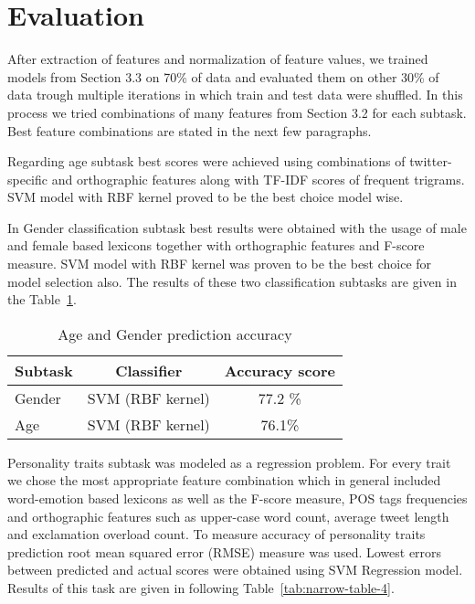 \documentclass[10pt, a4paper]{article}
\begin{document}
\section{Evaluation}
After extraction of features and normalization of feature values, we trained models from Section 3.3  on 70\% of data and evaluated them on other 30\% of data trough multiple iterations in which train and test data were shuffled. In this process we tried combinations of many features from Section 3.2 for each subtask. Best feature combinations are stated in the next few paragraphs. 
\par
Regarding age subtask best scores were achieved using combinations of twitter-specific  and orthographic features along with TF-IDF scores of frequent trigrams. SVM model with RBF kernel proved to be the best choice model wise.
\par
In Gender classification subtask best results were obtained with the usage of male and female based lexicons together with orthographic features and F-score measure. SVM model with RBF kernel was proven to be the best choice for model selection also. The results of these two classification subtasks are given in the Table~\ref{tab:narrow-table-3}.
\begin{table}[h]
\caption{Age and Gender prediction accuracy}
\label{tab:narrow-table-3}
\vspace{-6mm}
\begin{center}
\begin{tabular}{lcc}
\toprule
Subtask & Classifier & Accuracy score\\
\midrule
 Gender & SVM (RBF kernel) & 77.2 \% \\
 Age & SVM (RBF kernel) & 76.1\%\\
\bottomrule
\end{tabular}
\end{center}
\end{table}
\par
Personality traits subtask was modeled as a regression problem. For every trait we chose the most appropriate feature combination which in general included word-emotion based lexicons as well as the F-score measure, POS tags frequencies and orthographic features such as upper-case word count, average tweet length and exclamation overload count. To measure accuracy of personality traits prediction root mean squared error (RMSE) measure was used. Lowest errors between predicted and actual scores were obtained using SVM Regression model. Results of this task are given in following Table~\ref{tab:narrow-table-4}.
\end{document}
